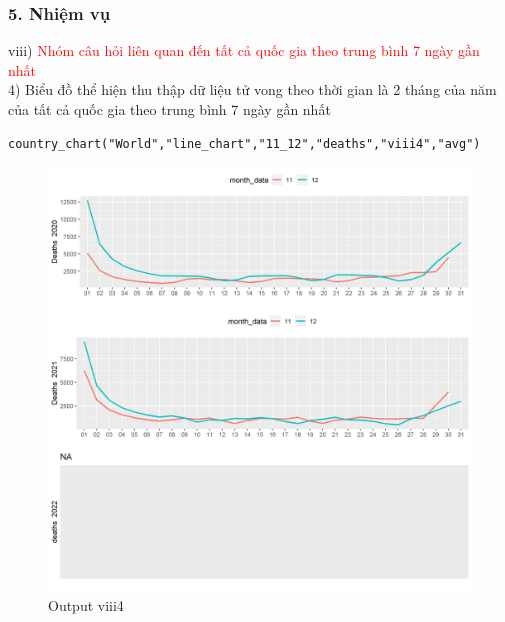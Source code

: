 \documentclass[english,10pt,table]{beamer}
\begin{document}
\begin{frame}[fragile]
\frametitle{5.  Nhiệm vụ}
viii) \textcolor{red}{Nhóm câu hỏi liên quan đến tất cả quốc gia theo trung bình 7 ngày gần nhất}\\
    4) Biểu đồ thể hiện thu thập dữ liệu tử vong theo thời gian là 2 tháng của năm của tất cả quốc gia theo trung bình 7 ngày gần nhất
\begin{lstlisting}[frame = single,basicstyle=\tiny]
country_chart("World","line_chart","11_12","deaths","viii4","avg")   
    \end{lstlisting}
			\begin{figure}[h!]
	\begin{center}
		    \includegraphics[scale = 0.21]{Images/VIII/viii4 World .jpeg}
		     \caption{Output viii4}
		\end{center}
		\end{figure}
\end{frame}
\end{document}
